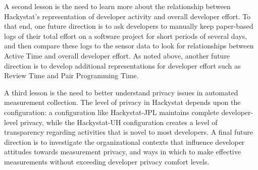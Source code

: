 \documentclass[10pt,twocolumn]{article}
\begin{document}
A second lesson is the need to learn more about the relationship between
Hackystat's representation of developer activity and overall developer
effort.  To that end, one future direction is to ask developers to manually keep
paper-based logs of their total effort on a software project for short
periods of several days, and then compare these logs to the sensor data to
look for relationships between Active Time and overall developer effort.
As noted above, another future direction is to develop additional representations for
developer effort such as Review Time and Pair Programming Time.

A third lesson is the need to better understand privacy issues in automated
measurement collection.  The level of privacy in Hackystat depends upon the
configuration: a configuration like Hackystat-JPL maintains complete
developer-level privacy, while the Hackystat-UH configuration creates a
level of transparency regarding activities that is novel to most
developers.  A final future direction is to investigate the organizational
contexts that influence developer attitudes towards measurement privacy,
and ways in which to make effective measurements without exceeding
developer privacy comfort levels. 




\end{document}
